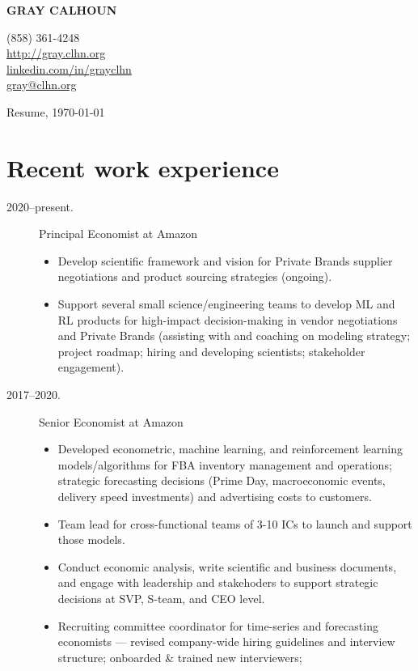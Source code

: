 \documentclass[10pt]{safecv}%
\begin{document}
\MakeUppercase{\textbf{Gray Calhoun}}
\hfill
\parbox[t][0pt]{5cm}{%
\hfill (858) 361-4248 \\
\hfill \url{http://gray.clhn.org}\\
\hfill \href{https://www.linkedin.com/in/grayclhn}{linkedin.com/in/grayclhn} \\
\hfill \url{gray@clhn.org}
}

\vspace{\itemsep}%
Resume, \today

\section*{Recent work experience}

\begin{description}
\item[2020--present.] Principal Economist at Amazon
  \begin{itemize}
  \item Develop scientific framework and vision for Private Brands
    supplier negotiations and product sourcing strategies (ongoing).
  \item Support several small science/engineering teams to develop ML
    and RL products for high-impact decision-making in vendor
    negotiations and Private Brands (assisting with and coaching on
    modeling strategy; project roadmap; hiring and developing
    scientists; stakeholder engagement).
  \end{itemize}
\item[2017--2020.] Senior Economist at Amazon
  \begin{itemize}
  \item Developed econometric, machine learning, and reinforcement
    learning models/algorithms for FBA inventory management and
    operations; strategic forecasting decisions (Prime Day,
    macroeconomic events, delivery speed investments) and advertising costs to customers.
  \item Team lead for cross-functional teams of 3-10 ICs to launch and support those models.
  \item Conduct economic analysis, write scientific and business
    documents, and engage with leadership and stakehoders to
    support strategic decisions at SVP, S-team, and CEO level.
  \item Recruiting committee coordinator for time-series and
    forecasting economists --- revised company-wide hiring guidelines
    and interview structure; onboarded \& trained new interviewers;

\end{itemize}
\end{description}
\end{document}
